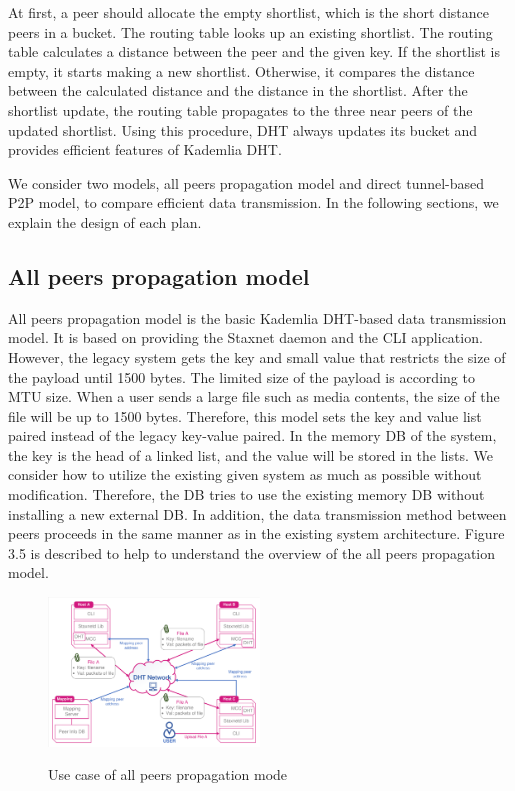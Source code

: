 At first, a peer should allocate the empty shortlist, which is the short distance peers in a bucket. The routing table looks up an existing shortlist. The routing table calculates a distance between the peer and the given key. If the shortlist is empty, it starts making a new shortlist. Otherwise, it compares the distance between the calculated distance and the distance in the shortlist. After the shortlist update, the routing table propagates to the three near peers of the updated shortlist. Using this procedure, DHT always updates its bucket and provides efficient features of Kademlia DHT.

We consider two models, all peers propagation model and direct tunnel-based P2P model, to compare efficient data transmission. In the following sections, we explain the design of each plan.

\subsection{All peers propagation model}

All peers propagation model is the basic Kademlia DHT-based data transmission model. It is based on providing the Staxnet daemon and the CLI application. However, the legacy system gets the key and small value that restricts the size of the payload until 1500 bytes. The limited size of the payload is according to MTU size. When a user sends a large file such as media contents, the size of the file will be up to 1500 bytes. Therefore, this model sets the key and value list paired instead of the legacy key-value paired. In the memory DB of the system, the key is the head of a linked list, and the value will be stored in the lists. We consider how to utilize the existing given system as much as possible without modification. Therefore, the DB tries to use the existing memory DB without installing a new external DB. In addition, the data transmission method between peers proceeds in the same manner as in the existing system architecture. Figure 3.5 is described to help to understand the overview of the all peers propagation model.

\begin{figure}[!ht]
	\centering
	\includegraphics[width=0.5\textwidth]{images/fig_3_5.pdf}\\
	\caption{Use case of all peers propagation mode}
	\label{fig:all peers}
\end{figure}

